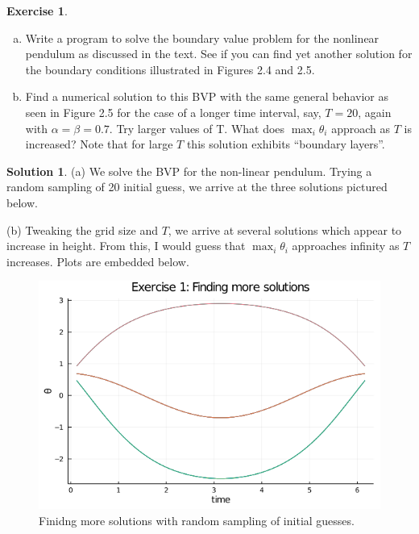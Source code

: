 \documentclass[12pt]{article}
\theoremstyle{definition}
\newtheorem{exer}{Exercise}
\newtheorem{sol}{Solution}
\theoremstyle{remark}
\begin{document}
\begin{exer}
    \begin{enumerate}[(a)]
        \item Write a program to solve the boundary value problem for the nonlinear pendulum as discussed in the text. See if you can find yet another solution for the boundary conditions illustrated in Figures 2.4 and 2.5.
        \item Find a numerical solution to this BVP with the same general behavior as seen in Figure 2.5 for the case of a longer time interval, say, $T = 20$, again with $\alpha = \beta = 0.7$. Try larger values of T. What does $\max_{i} \theta_{i}$ approach as $T$ is increased? Note that for large $T$ this solution exhibits “boundary layers”.
    \end{enumerate}
\end{exer}


\begin{sol}

    (a) We solve the BVP for the non-linear pendulum. Trying a random sampling of 20 initial guess, we arrive at the three solutions pictured below.


    (b) Tweaking the grid size and $T$, we arrive at several solutions which appear to increase in height. From this, I would guess that $\max_{i} \theta_{i}$ approaches infinity as $T$ increases. Plots are embedded below.
\end{sol}
\begin{figure}[h]
    \centering
    \includegraphics[width=0.8\linewidth]{figs/hw-3-exer1-more-sol.png}
    \caption{Finidng more solutions with random sampling of initial guesses.}%
    \label{fig:figs/hw-3-exer1-more-sol}
\end{figure}


\newpage
\end{document}
